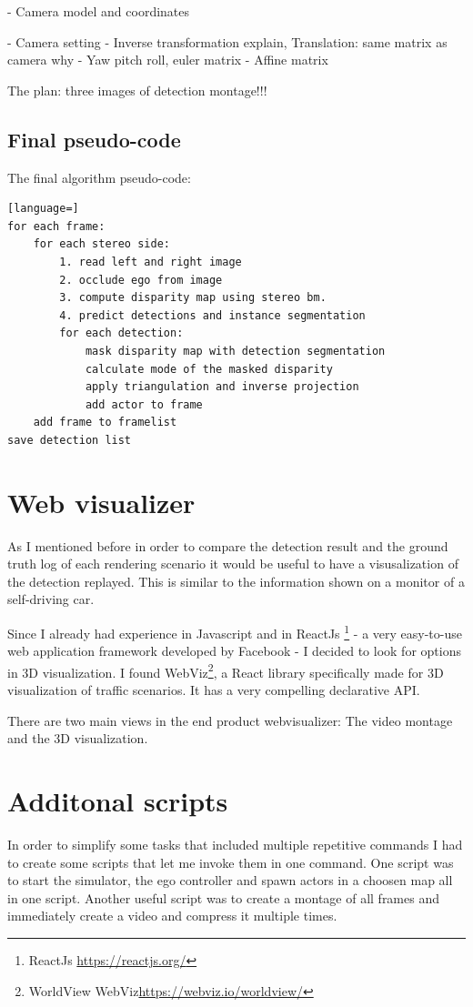 - Camera model and coordinates

- Camera setting
- Inverse transformation explain, Translation: same matrix as camera why
- Yaw pitch roll, euler matrix
- Affine matrix

The plan: 
three images of detection montage!!!


\subsection{Final pseudo-code}
The final algorithm pseudo-code:
\begin{lstlisting}[language=]
for each frame:
    for each stereo side:
        1. read left and right image
        2. occlude ego from image
        3. compute disparity map using stereo bm.
        4. predict detections and instance segmentation
        for each detection:
            mask disparity map with detection segmentation
            calculate mode of the masked disparity
            apply triangulation and inverse projection
            add actor to frame
    add frame to framelist
save detection list
\end{lstlisting}

\section{Web visualizer}
As I mentioned before in order to compare the detection result and the ground
truth log of each rendering scenario it would be useful to have a visusalization
of the detection replayed. This is similar to the information shown on a monitor
of a self-driving car.

Since I already had experience in Javascript and in ReactJs \footnote{ReactJs
    \url{https://reactjs.org/}} - a very easy-to-use web application framework
developed by Facebook - I decided to look for options in 3D visualization. I
found WebViz\footnote{WorldView WebViz\url{https://webviz.io/worldview/}}, a
React library specifically made for 3D visualization of traffic scenarios. It
has a very compelling declarative API.

There are two main views in the end product webvisualizer: The video montage and
the 3D visualization.

\section{Additonal scripts}

In order to simplify some tasks that included multiple repetitive commands I had
to create some scripts that let me invoke them in one command. One script was to
start the simulator, the ego controller and spawn actors in a choosen map all in
one script. Another useful script was to create a montage of all frames and
immediately create a video and compress it multiple times.
